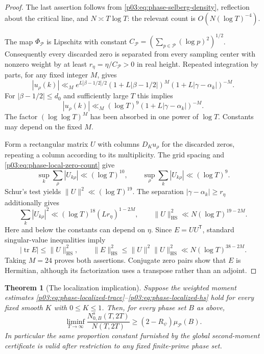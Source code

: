 \documentclass[11pt,letterpaper]{article}
\newtheorem{theorem}{Theorem}[section]
\theoremstyle{definition}
\theoremstyle{remark}
\newcommand{\1}{\mathbf 1}
\begin{document}
\begin{proof}
The last assertion follows from \eqref{p03:eq:phase-selberg-density},
reflection about the critical line, and $N\asymp T\log T$: the
relevant count is $O(N(\log T)^{-4})$.

The map $\Phi_{\mathcal P}$ is Lipschitz with constant
$C_{\mathcal P}=(\sum_{p\in\mathcal P}(\log p)^2)^{1/2}$.
Consequently every discarded zero is separated from every sampling
center with nonzero weight by at least
$r_\eta=\eta/C_{\mathcal P}>0$ in real height.
Repeated integration by parts, for any fixed integer $M$, gives
\[
 |u_\rho(k)|\ll_M
 e^{L|\beta-1/2|/2}
 (1+L|\beta-1/2|)^M
 (1+L|\gamma-\alpha_k|)^{-M}.
\]
For $|\beta-1/2|\le d_0$ and sufficiently large $T$ this implies
\begin{equation}
 |u_\rho(k)|\ll_M
 (\log T)^9(1+L|\gamma-\alpha_k|)^{-M}.
 \label{p03:eq:phase-shallow-vector-bound}
\end{equation}
The factor $(\log\log T)^M$ has been absorbed in one power of
$\log T$.  Constants may depend on the fixed $M$.

Form a rectangular matrix $U$ with columns $D_Ku_\rho$ for the
discarded zeros, repeating a column according to its multiplicity.
The grid spacing and \eqref{p03:eq:phase-local-zero-count} give
\[
 \sup_k\sum_\rho|U_{k\rho}|\ll(\log T)^{10},
 \qquad
 \sup_\rho\sum_k|U_{k\rho}|\ll(\log T)^9.
\]
Schur's test yields $\|U\|^2\ll(\log T)^{19}$.  The separation
$|\gamma-\alpha_k|\ge r_\eta$ additionally gives
\[
 \sum_k|U_{k\rho}|^2
 \ll (\log T)^{18}(Lr_\eta)^{1-2M},
 \qquad
 \|U\|_{\mathrm{HS}}^2
 \ll N(\log T)^{19-2M}.
\]
Here and below the constants can depend on $\eta$.
Since $E=UU^{\mathsf T}$, standard singular-value inequalities imply
\[
 |\operatorname{tr}E|\le\|U\|_{\mathrm{HS}}^2,
 \qquad
 \|E\|_{\mathrm{HS}}^2
 \le\|U\|^2\|U\|_{\mathrm{HS}}^2
 \ll N(\log T)^{38-2M}.
\]
Taking $M=24$ proves both assertions.  Conjugate zero pairs show that
$E$ is Hermitian, although its factorization uses a transpose rather
than an adjoint.
\end{proof}

\begin{theorem}[The localization implication]
\label{p03:thm:phase-localization}
Suppose the weighted moment estimates
\eqref{p03:eq:phase-localized-trace}--\eqref{p03:eq:phase-localized-hs} hold
for every fixed smooth $K$ with $0\le K\le1$.  Then, for every phase
set $B$ as above,
\begin{equation}
 \liminf_{T\to\infty}\frac{N^s_{0,B}(T,2T)}{N(T,2T)}
 \ge (2-R_\psi)\mu_{\mathcal P}(B).
 \label{p03:eq:phase-proportion-conclusion}
\end{equation}
In particular the same proportion constant furnished by the global
second-moment certificate is valid after restriction to any fixed
finite-prime phase set.
\end{theorem}
\end{document}
